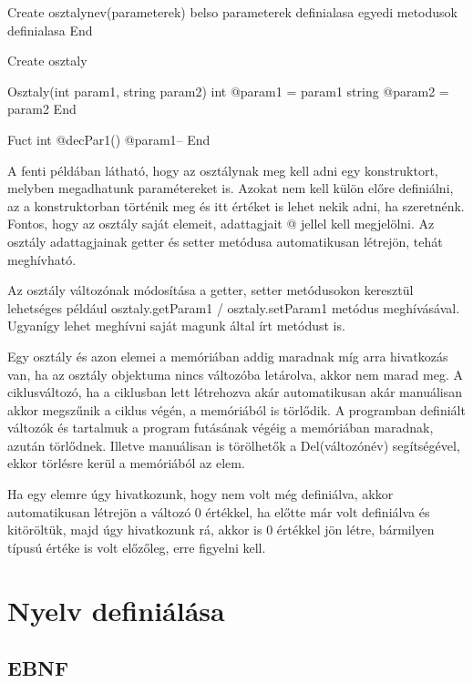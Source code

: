 \begin{cpp}
Create osztalynev(parameterek)
	belso parameterek definialasa
	egyedi metodusok definialasa
End
\end{cpp}

\begin{cpp}
Create osztaly
	
	Osztaly(int param1, string param2)
		int @param1 = param1
		string @param2 = param2
	End
		
	Fuct int @decPar1()
		@param1--
	End
\end{cpp}

A fenti példában látható, hogy az osztálynak meg kell adni egy konstruktort, melyben megadhatunk paramétereket is. Azokat nem kell külön előre definiálni, az a konstruktorban történik meg és itt értéket is lehet nekik adni, ha szeretnénk. Fontos, hogy az osztály saját elemeit, adattagjait @ jellel kell megjelölni. Az osztály adattagjainak getter és setter metódusa automatikusan létrejön, tehát meghívható.

Az osztály változónak módosítása a getter, setter metódusokon keresztül lehetséges például osztaly.getParam1 / osztaly.setParam1 metódus meghívásával. Ugyanígy lehet meghívni saját magunk által írt metódust is.

Egy osztály és azon elemei a memóriában addig maradnak míg arra hivatkozás van, ha az osztály objektuma nincs változóba letárolva, akkor nem marad meg. A ciklusváltozó, ha a ciklusban lett létrehozva akár automatikusan akár manuálisan akkor megszűnik a ciklus végén, a memóriából is törlődik. A programban definiált változók és tartalmuk a program futásának végéig a memóriában maradnak, azután törlődnek. Illetve manuálisan is törölhetők a Del(változónév) segítségével, ekkor törlésre kerül a memóriából az elem.

Ha egy elemre úgy hivatkozunk, hogy nem volt még definiálva, akkor automatikusan létrejön a változó 0 értékkel, ha előtte már volt definiálva és kitöröltük, majd úgy hivatkozunk rá, akkor is 0 értékkel jön létre, bármilyen típusú értéke is volt előzőleg, erre figyelni kell.

\section{Nyelv definiálása}

\subsection{EBNF}

